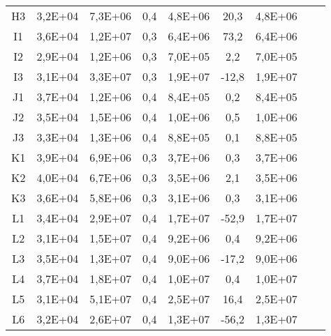 \begin{center}
\begin{longtable}{ccccccccc}
H3    & 3,2E+04 & 7,3E+06 & 0,4   & 4,8E+06 & 20,3  & 4,8E+06 \\
I1    & 3,6E+04 & 1,2E+07 & 0,3   & 6,4E+06 & 73,2  & 6,4E+06 \\
I2    & 2,9E+04 & 1,2E+06 & 0,3   & 7,0E+05 & 2,2   & 7,0E+05 \\
I3    & 3,1E+04 & 3,3E+07 & 0,3   & 1,9E+07 & -12,8 & 1,9E+07 \\
J1    & 3,7E+04 & 1,2E+06 & 0,4   & 8,4E+05 & 0,2   & 8,4E+05 \\
J2    & 3,5E+04 & 1,5E+06 & 0,4   & 1,0E+06 & 0,5   & 1,0E+06 \\
J3    & 3,3E+04 & 1,3E+06 & 0,4   & 8,8E+05 & 0,1   & 8,8E+05 \\
K1    & 3,9E+04 & 6,9E+06 & 0,3   & 3,7E+06 & 0,3   & 3,7E+06 \\
K2    & 4,0E+04 & 6,7E+06 & 0,3   & 3,5E+06 & 2,1   & 3,5E+06 \\
K3    & 3,6E+04 & 5,8E+06 & 0,3   & 3,1E+06 & 0,3   & 3,1E+06 \\
L1    & 3,4E+04 & 2,9E+07 & 0,4   & 1,7E+07 & -52,9 & 1,7E+07 \\
L2    & 3,1E+04 & 1,5E+07 & 0,4   & 9,2E+06 & 0,4   & 9,2E+06 \\
L3    & 3,5E+04 & 1,3E+07 & 0,4   & 9,0E+06 & -17,2 & 9,0E+06 \\
L4    & 3,7E+04 & 1,8E+07 & 0,4   & 1,0E+07 & 0,4   & 1,0E+07 \\
L5    & 3,1E+04 & 5,1E+07 & 0,4   & 2,5E+07 & 16,4  & 2,5E+07 \\
L6    & 3,2E+04 & 2,6E+07 & 0,4   & 1,3E+07 & -56,2 & 1,3E+07 \\
\end{longtable}
\end{center}

